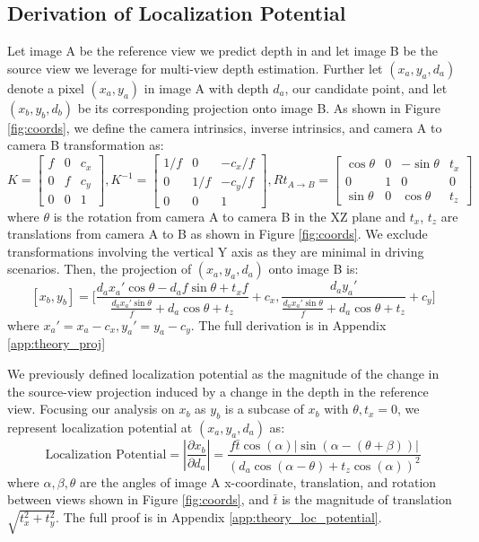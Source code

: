 \documentclass[runningheads, hyperfootnotes=false]{article}
\begin{document}
\subsection{Derivation of Localization Potential}
Let image A be the reference view we predict depth in and let image B be the source view we leverage for multi-view depth estimation. Further let $(x_a, y_a, d_a)$ denote a pixel $(x_a, y_a)$ in image A with depth $d_a$, our candidate point, and let $(x_b, y_b, d_b)$ be its corresponding projection onto image B. As shown in Figure \ref{fig:coords}, we define the camera intrinsics, inverse intrinsics, and camera A to camera B transformation as:
\begin{equation}\label{eq:def}
K = \begin{bmatrix}
f & 0 & c_x \\
0 & f & c_y \\
0 & 0 & 1
\end{bmatrix}, 
K^{-1} = \begin{bmatrix}
1/f & 0 & -c_x/f \\
0 & 1/f & -c_y/f \\
0 & 0 & 1
\end{bmatrix},
Rt_{A\rightarrow B} = \left[\begin{array}{ccc|c}
\cos{\theta} & 0 & -\sin{\theta} & t_x \\
0 & 1 & 0 & 0 \\
\sin{\theta} & 0 & \cos{\theta} & t_z
\end{array}\right]
\end{equation}
where $\theta$ is the rotation from camera A to camera B in the XZ plane and $t_x$, $t_z$ are translations from camera A to B as shown in Figure \ref{fig:coords}. We exclude transformations involving the vertical Y axis as they are minimal in driving scenarios. Then, the projection of $(x_a, y_a, d_a)$ onto image B is:
\begin{equation}\label{eq:proj}
[x_b, y_b] = 
\Bigg[
\frac{d_a x_a' \cos{\theta} - d_a f \sin{\theta} + t_x f}{\frac{d_a x_a' \sin{\theta}}{f} + d_a \cos{\theta} + t_z} + c_x, \frac{d_a y_a'}{\frac{d_a x_a' \sin{\theta}}{f} + d_a \cos{\theta} + t_z} + c_y
\Bigg]
\end{equation}
where $x_a' = x_a - c_x, y_a' = y_a - c_y$. The full derivation is in Appendix \ref{app:theory_proj}

We previously defined localization potential as the magnitude of the change in the source-view projection induced by a change in the depth in the reference view. Focusing our analysis on $x_b$ as $y_b$ is a subcase of $x_b$ with $\theta,  t_x = 0$, we represent localization potential at $(x_a, y_a, d_a)$ as:
\begin{equation}\label{eq:math_localization_potential}
\text{Localization Potential} = \left\lvert \frac{\partial x_b}{\partial d_a} \right\rvert = \frac{f \bar{t} \cos(\alpha) |\sin(\alpha - (\theta + \beta))|}{(d_a \cos(\alpha - \theta) + t_z\cos(\alpha))^2}
\end{equation}
where $\alpha, \beta, \theta$ are the angles of image A x-coordinate, translation, and rotation between views shown in Figure \ref{fig:coords}, and $\bar{t}$ is the magnitude of translation $\sqrt{t_x^2 + t_y^2}$.
The full proof is in Appendix \ref{app:theory_loc_potential}.
\end{document}
